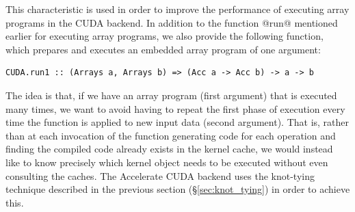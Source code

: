 This characteristic is used in order to improve the performance of executing
array programs in the CUDA backend. In addition to the function @run@
mentioned earlier for executing array programs, we also provide the following
function, which prepares and executes an embedded array program of one argument:
%
\begin{lstlisting}[style=haskell]
CUDA.run1 :: (Arrays a, Arrays b) => (Acc a -> Acc b) -> a -> b
\end{lstlisting}
%
The idea is that, if we have an array program (first argument) that is executed
many times, we want to avoid having to repeat the first phase of execution every
time the function is applied to new input data (second argument). That is,
rather than at each invocation of the function generating code for each
operation and finding the compiled code already exists in the kernel cache, we
would instead like to know precisely which kernel object needs to be executed
without even consulting the caches. The Accelerate CUDA backend uses the
knot-tying technique described in the previous section (\S\ref{sec:knot_tying})
in order to achieve this.

